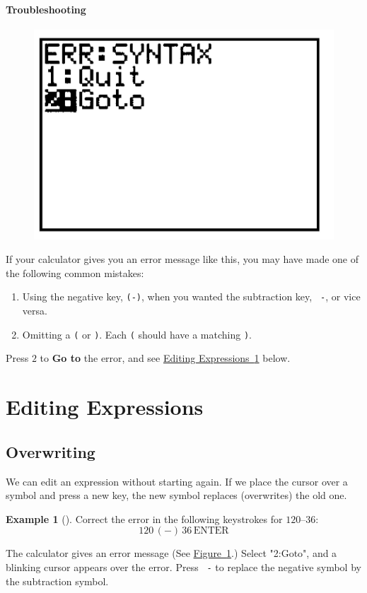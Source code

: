 \documentclass[10pt,]{book}
\newcommand{\terminology}[1]{\textbf{#1}}
\theoremstyle{plain}
\theoremstyle{definition}
\theoremstyle{definition}
\newtheorem{example}[theorem]{Example}
\theoremstyle{definition}
\numberwithin{equation}{part}
\begin{document}
\paragraph[{Troubleshooting}]{Troubleshooting}\hypertarget{paragraphs-2}{}
\leavevmode%
\begin{figure}
\centering
\includegraphics[width=0.25\linewidth]{images/fig-GC-syntax.jpg}
\caption{\label{fig-GC-syntax}}
\end{figure}
 If your calculator gives you an error message like this, you may have made one of the following common mistakes: \leavevmode%
\begin{enumerate}[label=*\arabic**]
\item\hypertarget{li-407}{}Using the negative key, \lstinline?(-)?, when you wanted the subtraction key, \lstinline? -?, or vice versa.%
\item\hypertarget{li-408}{}Omitting a \lstinline?(? or \lstinline?)?. Each \lstinline?(? should have a matching \lstinline?)?.%
\end{enumerate}
 Press \(2\) to \terminology{Go to} the error, and see \hyperref[appendix-Editing-Expressions]{Editing Expressions~\ref{appendix-Editing-Expressions}} below.%
\typeout{************************************************}
\typeout{************************************************}
\section[{Editing Expressions}]{Editing Expressions}\label{appendix-Editing-Expressions}
\typeout{************************************************}
\typeout{************************************************}
\subsection[{Overwriting}]{Overwriting}\label{subsection-72}
We can edit an expression without starting again. If we place the cursor over a symbol and press a new key, the new symbol replaces (overwrites) the old one.%
\begin{example}[]\label{example-111}
Correct the error in the following keystrokes for \(120 – 36\):%
\begin{equation*}
120 \, \boxed{(-)} \, 36\, \boxed{\text{ENTER}} 
\end{equation*}
%
\par
The calculator gives an error message (See \hyperref[fig-GC-syntax]{Figure~\ref{fig-GC-syntax}}.) Select "2:Goto", and a blinking cursor appears over the error. Press \lstinline? -? to replace the negative symbol by the subtraction symbol.%
\end{example}
\typeout{************************************************}
\typeout{************************************************}
\end{document}
